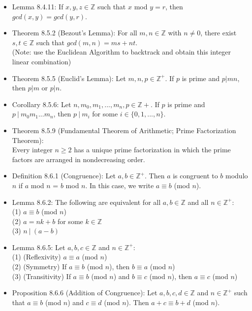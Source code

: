 \documentclass{article}
\begin{document}
\begin{itemize}
    \item Lemma 8.4.11: If $x,y,z\in \mathbb{Z}$ such that $x$ mod $y=r$, then $gcd(x,y)=gcd(y,r)$.
    \item Theorem 8.5.2 (Bezout's Lemma): For all $m,n\in \mathbb{Z}$ with $n\neq 0$, there exist $s,t\in \mathbb{Z}$ such that $gcd(m,n)=ms+nt$.
        \\ (Note: use the Euclidean Algorithm to backtrack and obtain this integer linear combination)
    \item Theorem 8.5.5 (Euclid's Lemma): Let $m,n,p\in \mathbb{Z}^+$. If $p$ is prime and $p|mn$, then $p|m$ or $p|n$.
    \item Corollary 8.5.6: Let $n,m_0,m_1,...,m_n,p\in \mathbb{Z}+$. If $p$ is prime and $p\ |\ m_0m_1...m_n$, then $p\ |\ m_i$ for some $i \in \{0,1,...,n\}$.
    \item Theorem 8.5.9 (Fundamental Theorem of Arithmetic; Prime Factorization Theorem):
        \\ Every integer $n\geqslant 2$ has a unique prime factorization in which the prime factors are arranged in nondecreasing order.
    \item Definition 8.6.1 (Congruence): Let $a,b\in \mathbb{Z}^+$. Then $a$ is congruent to $b$ modulo $n$ if $a$ mod $n$ = $b$ mod $n$. In this case, we write $a \equiv b$ (mod $n$).
    \item Lemma 8.6.2: The following are equivalent for all $a, b\in \mathbb{Z}$ and all $n\in \mathbb{Z}^+$:
        \\ \hspace*{3mm} (1) $a\equiv b$ (mod $n$)
        \\ \hspace*{3mm} (2) $a = nk + b$ for some $k\in \mathbb{Z}$
        \\ \hspace*{3mm} (3) $n\ |\ (a-b)$
    \item Lemma 8.6.5: Let $a,b,c\in \mathbb{Z}$ and $n\in \mathbb{Z}^+$:
        \\ \hspace*{3mm} (1) (Reflexivity) $a \equiv a$ (mod $n$)
        \\ \hspace*{3mm} (2) (Symmetry) If $a \equiv b$ (mod $n$), then $b \equiv a$ (mod $n$)
        \\ \hspace*{3mm} (3) (Transitivity) If $a\equiv b$ (mod $n$) and $b \equiv c$ (mod $n$), then $a\equiv c$ (mod $n$)
    \item Proposition 8.6.6 (Addition of Congruence): Let $a,b,c,d \in \mathbb{Z}$ and $n \in \mathbb{Z}^+$ such that $a\equiv b$ (mod $n$) and $c \equiv d$ (mod $n$). Then $a+c\equiv b + d$ (mod $n$).

\end{itemize}
\end{document}
